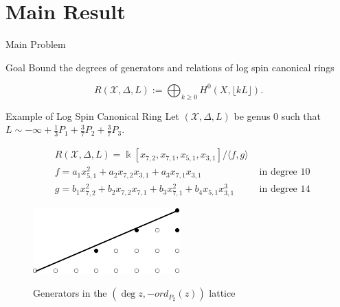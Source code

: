 \documentclass{beamer}
\theoremstyle{remark}
\newcommand \sx{{\mathscr X}}
\newcommand{\halfcan}{L}
\newcommand\Bk{{\Bbbk}}
\begin{document}
\section{Main Result}

\begin{frame}{Main Problem}

\begin{block}{Goal}
Bound the degrees of generators and relations of log spin
canonical rings

\[
	R(\sx, \Delta, \halfcan) := \bigoplus_{k \geq 0} H^0(X, \lfloor k \halfcan \rfloor).
\]
\end{block}
\end{frame}

\begin{frame}{Example of Log Spin Canonical Ring}
Let $(\sx, \Delta, \halfcan)$ be genus 0 such that $\halfcan \sim -\infty + \frac{1}{3} P_1 +
\frac{3}{7} P_2 + \frac{3}{7} P_3$. 

\vspace*{-0.5cm}
\begin{align*}
	&R(\sx, \Delta, \halfcan) = \Bk[x_{7, 2}, x_{7, 1}, x_{5, 1}, x_{3, 1}] / \langle f, g \rangle \\
	&f = a_1 x_{5, 1}^2 + a_2 x_{7, 2} x_{3, 1} + a_3 x_{7, 1} x_{3, 1} 
	&\text{ in degree $10$} \\
	&g = b_1 x_{7, 2}^2 + b_2 x_{7, 2} x_{7, 1} + b_3 x_{7, 1}^2
	+ b_4 x_{5, 1} x_{3, 1}^3  &\text{ in degree $14$}
\end{align*}

\begin{figure}
\includegraphics{pics/spin-377-pic-pics.pdf} \\
\caption{Generators in the $(\deg z, -ord_{P_2}(z))$ lattice}
\end{figure}

\end{frame}
\end{document}
